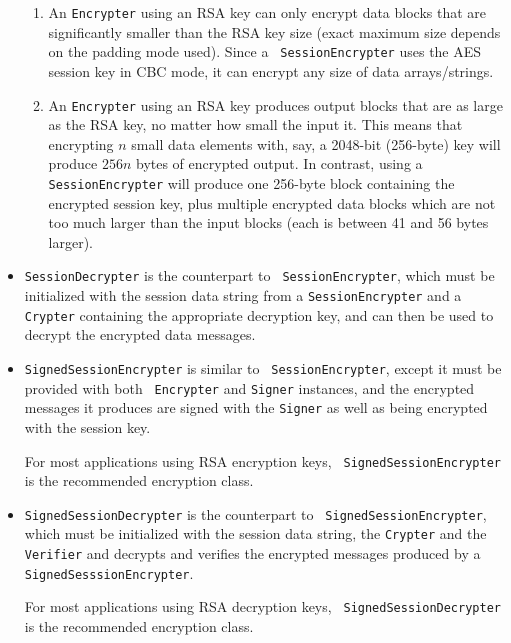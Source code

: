 \documentclass{llncs}
\begin{document}
\begin{itemize}
  \begin{enumerate}

  \item An {\tt Encrypter} using an RSA key can only encrypt data
    blocks that are significantly smaller than the RSA key size (exact
    maximum size depends on the padding mode used).  Since a {\tt
      SessionEncrypter} uses the AES session key in CBC mode, it can
    encrypt any size of data arrays/strings.

  \item An {\tt Encrypter} using an RSA key produces output blocks
    that are as large as the RSA key, no matter how small the input
    it.  This means that encrypting $n$ small data elements with, say,
    a 2048-bit (256-byte) key will produce $256n$ bytes of encrypted
    output.  In contrast, using a {\tt SessionEncrypter} will produce
    one 256-byte block containing the encrypted session key, plus
    multiple encrypted data blocks which are not too much larger than
    the input blocks (each is between 41 and 56 bytes larger).
    
  \end{enumerate}

\item {\tt SessionDecrypter} is the counterpart to {\tt
    SessionEncrypter}, which must be initialized with the session data
  string from a {\tt SessionEncrypter} and a {\tt Crypter} containing
  the appropriate decryption key, and can then be used to decrypt the
  encrypted data messages.

\item {\tt SignedSessionEncrypter} is similar to {\tt
    SessionEncrypter}, except it must be provided with both {\tt
    Encrypter} and {\tt Signer} instances, and the encrypted messages
  it produces are signed with the {\tt Signer} as well as being
  encrypted with the session key.

  For most applications using RSA encryption keys, {\tt
    SignedSessionEncrypter} is the recommended encryption class.

\item {\tt SignedSessionDecrypter} is the counterpart to {\tt
    SignedSessionEncrypter}, which must be initialized with the
  session data string, the {\tt Crypter} and the {\tt Verifier} and
  decrypts and verifies the encrypted messages produced by a {\tt
    SignedSesssionEncrypter}.

  For most applications using RSA decryption keys, {\tt
    SignedSessionDecrypter} is the recommended encryption class.

\end{itemize}
\end{document}
